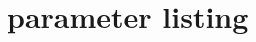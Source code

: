 \documentclass[fleqn]{report}
\numberwithin{equation}{section}
\numberwithin{equation}{section}
\begin{document}
					
	
	
\chapter{parameter listing}
\end{document}
